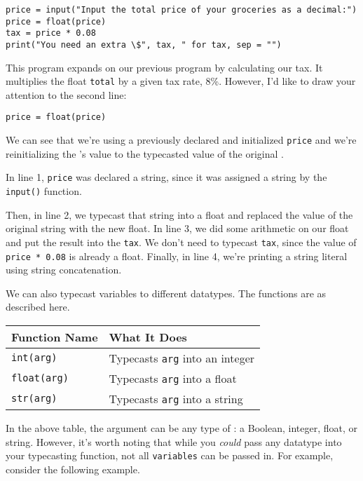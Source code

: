 \begin{lstlisting}[style=pippython]
price = input("Input the total price of your groceries as a decimal:")
price = float(price)
tax = price * 0.08
print("You need an extra \$", tax, " for tax, sep = "")
\end{lstlisting}
This program expands on our previous program by calculating our tax. It multiplies the float  \verb|total| by a given tax rate, 8\%. However, I'd like to draw your attention to the second line:\par
\begin{lstlisting}[style=pippython]
price = float(price)
\end{lstlisting}
We can see that we're using a previously declared and initialized  \verb|price| and we're reinitializing the 's value to the typecasted value of the original .\par
In line 1, \verb|price| was declared a string, since it was assigned a string by the \verb|input()| function.\par Then, in line 2, we typecast that string into a float and replaced the value of the original string with the new float. In line 3, we did some arithmetic on our float and put the result into the  \verb|tax|. We don't need to typecast \verb|tax|, since the value of \verb|price * 0.08| is already a float. Finally, in line 4, we're printing a string literal using string concatenation.\par
We can also typecast variables to different datatypes. The functions are as described here.\par
\vspace{5mm}
\begin{tabular}{|l|l|}
\hline
Function Name     & What It Does                         \\
\hline
\verb|int(arg)|   & Typecasts \verb|arg| into an integer \\
\hline
\verb|float(arg)| & Typecasts \verb|arg| into a float    \\
\hline
\verb|str(arg)|   & Typecasts \verb|arg| into a string   \\
\hline
\end{tabular}
\vspace{5mm}\par
In the above table, the argument can be any type of : a Boolean, integer, float, or string. However, it's worth noting that while you \textit{could} pass any datatype into your typecasting function, not all \verb|variables| can be passed in. For example, consider the following example.
